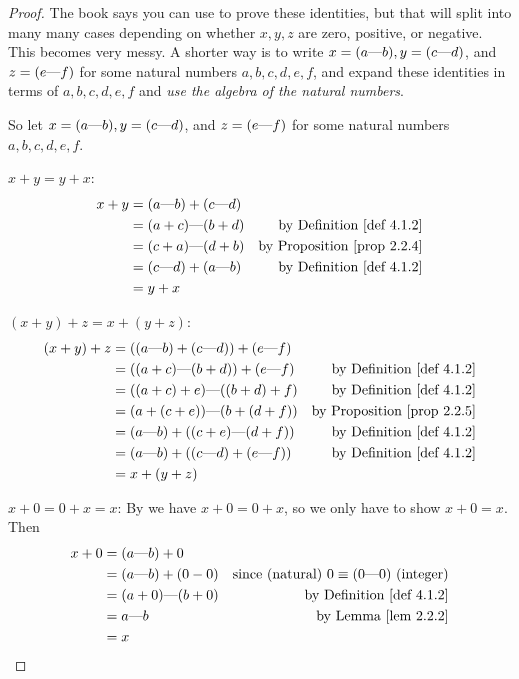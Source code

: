 \begin{proof}
The book says you can use  to prove these identities, but that will split into many many cases depending on whether \(x, y, z\) are zero, positive, or negative.
This becomes very messy.
A shorter way is to write \(x =(a \text{---} b), y = (c \text{---} d)\), and \(z = (e \text{---} f)\) for some natural numbers \(a, b, c, d, e, f\), and expand these identities in terms of \(a, b, c, d, e, f\) and \emph{use the algebra of the natural numbers}.

So let \(x =(a \text{---} b), y = (c \text{---} d)\), and \(z = (e \text{---} f)\) for some natural numbers \(a, b, c, d, e, f\).

 \(x + y = y + x\):
\begin{align*}
    x + y & = (a \M b) + (c \M d) \\
          & = (a + c) \M (b + d) & \text{by \DEF{4.1.2}} \\
          & = (c + a) \M (d + b) & \text{by \PROP{2.2.4}} \\
          & = (c \M d) + (a \M b) & \text{by \DEF{4.1.2}} \\
          & = y + x
\end{align*}

 \((x + y) + z = x + (y + z)\):
\begin{align*}
    (x + y) + z & = ((a \M b) + (c \M d)) + (e \M f) \\
                & = ((a + c) \M (b + d)) + (e \M f) & \text{by \DEF{4.1.2}} \\
                & = ((a + c) + e) \M ((b + d) + f) & \text{by \DEF{4.1.2}} \\
                & = (a + (c + e)) \M (b + (d + f)) & \text{by \PROP{2.2.5}} \\
                & = (a \M b) + ((c + e) \M (d + f)) & \text{by \DEF{4.1.2}} \\
                & = (a \M b) + ((c \M d) + (e \M f)) & \text{by \DEF{4.1.2}} \\
                & = x + (y + z)
\end{align*}

 \(x + 0 = 0 + x = x\):
By  we have \(x + 0 = 0 + x\), so we only have to show \(x + 0 = x\).
Then
\begin{align*}
    x + 0 & = (a \M b) + 0 \\
          & = (a \M b) + (0 - 0) & \text{since (natural) \(0 \equiv (0 \M 0)\) (integer)} \\
          & = (a + 0) \M (b + 0) & \text{by \DEF{4.1.2}} \\
          & = a \M b & \text{by \LEM{2.2.2}} \\
          & = x
\end{align*}


\end{proof}
